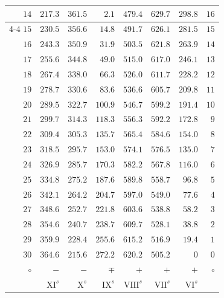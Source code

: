 \begin{center}
\begin{tabular}{r|r|r|r|r|r|r|r}
$14$ & $217.3$ & $361.5$ & $2.1$ & $479.4$ & $629.7$ & $298.8$ & $16$ \\
\cline{4-4}
$15$ & $230.5$ & $356.6$ & $14.8$ & $491.7$ & $626.1$ & $281.5$ & $15$ \\[3pt]
$16$ & $243.3$ & $350.9$ & $31.9$ & $503.5$ & $621.8$ & $263.9$ & $14$ \\
$17$ & $255.6$ & $344.8$ & $49.0$ & $515.0$ & $617.0$ & $246.1$ & $13$ \\
$18$ & $267.4$ & $338.0$ & $66.3$ & $526.0$ & $611.7$ & $228.2$ & $12$ \\
$19$ & $278.7$ & $330.6$ & $83.6$ & $536.6$ & $605.7$ & $209.8$ & $11$ \\
$20$ & $289.5$ & $322.7$ & $100.9$ & $546.7$ & $599.2$ & $191.4$ & $10$ \\[3pt]
$21$ & $299.7$ & $314.3$ & $118.3$ & $556.3$ & $592.2$ & $172.8$ & $9$ \\
$22$ & $309.4$ & $305.3$ & $135.7$ & $565.4$ & $584.6$ & $154.0$ & $8$ \\
$23$ & $318.5$ & $295.7$ & $153.0$ & $574.1$ & $576.5$ & $135.0$ & $7$ \\
$24$ & $326.9$ & $285.7$ & $170.3$ & $582.2$ & $567.8$ & $116.0$ & $6$ \\
$25$ & $334.8$ & $275.2$ & $187.6$ & $589.8$ & $558.7$ & $96.8$ & $5$ \\[3pt]
$26$ & $342.1$ & $264.2$ & $204.7$ & $597.0$ & $549.0$ & $77.6$ & $4$ \\
$27$ & $348.6$ & $252.7$ & $221.8$ & $603.6$ & $538.8$ & $58.2$ & $3$ \\
$28$ & $354.6$ & $240.7$ & $238.7$ & $609.7$ & $528.1$ & $38.8$ & $2$ \\
$29$ & $359.9$ & $228.4$ & $255.6$ & $615.2$ & $516.9$ & $19.4$ & $1$ \\
$30$ & $364.6$ & $215.6$ & $272.2$ & $620.2$ & $505.2$ & $0$ & $0$ \\
\hline $\circ$ & $-$ & $-$ & $\mp$ & $+$ & $+$ & $+$ & $\circ$ \\
 & $\mathrm{XI}^s$ & $\mathrm{X}^s$ & $\mathrm{IX}^s$ & $\mathrm{VIII}^s$ & $\mathrm{VII}^s$ & $\mathrm{VI}^s$ & \\
\end{tabular}\endgroup
\end{center}

\clearpage

